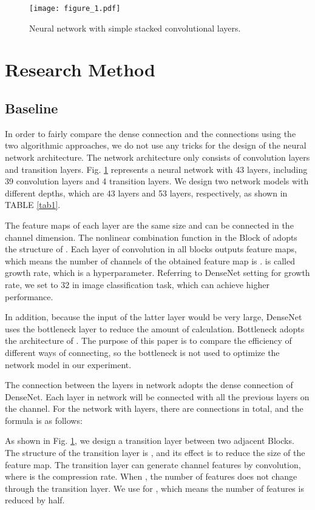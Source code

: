 \documentclass[conference]{IEEEtran}
\begin{document}
\begin{figure}[htbp]
\centerline{\texttt{[image: figure\_1.pdf]}}
\caption{Neural network with simple stacked convolutional layers.}
\label{fig1}
\end{figure}

\section{Research Method}
\subsection{Baseline}
In order to fairly compare the dense connection and the connections using the two algorithmic approaches, we do not  use any tricks for the design of the neural network architecture.  The network architecture only consists of convolution layers and transition layers. Fig. \ref{fig1} represents a neural network with 43 layers, including 39 convolution layers and 4 transition layers. We design two network models with different depths, which are 43 layers and 53 layers, respectively, as shown in TABLE \ref{tab1}.

The feature maps of each layer are the same size and can be connected in the channel dimension. The nonlinear combination function  in the Block of  adopts the structure of . Each layer of convolution in all blocks outputs  feature maps, which means the number of channels of the obtained feature map is .  is called growth rate, which is a hyperparameter. Referring to DenseNet \cite{huang2017densely} setting for growth rate, we set  to 32 in image classification task, which can achieve higher performance.

In addition, because the input of the latter layer would be very large, DenseNet uses the bottleneck layer to reduce the amount of calculation. Bottleneck adopts the architecture of . The purpose of this paper is to compare the efficiency of different ways of connecting, so the bottleneck is not used to optimize the network model in our experiment.

The connection between the layers in  network adopts the dense connection of DenseNet. Each layer in   network will be connected with all the previous layers on the channel. For the network with  layers, there are  connections in total, and the formula is as follows:



As shown in Fig. \ref{fig1}, we design a transition layer between two adjacent Blocks. The structure of the transition layer is , and its effect is to reduce the size of the feature map. The transition layer can generate  channel features by convolution, where  is the compression rate. When , the number of features does not change through the transition layer. We use  for , which means the number of features is reduced by half.
\end{document}
